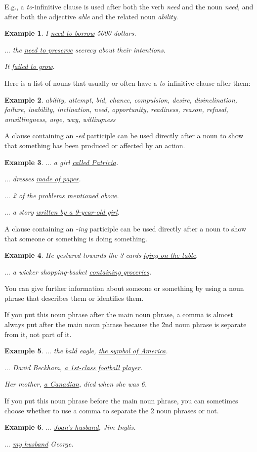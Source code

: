 \documentclass[oneside]{book}
\numberwithin{equation}{section}
\newtheorem{example}{Example}[section]
\begin{document}
E.g., a \textit{to}-infinitive clause is used after both the verb \textit{need} and the noun \textit{need}, and after both the adjective \textit{able} and the related noun \textit{ability}.
\begin{example}
    I \underline{need to borrow} 5000 dollars.
    
    $\ldots$ the \underline{need to preserve} secrecy about their intentions.
    
    It \underline{failed to grow}.
\end{example}
%
\noindent{} Here is a list of nouns that usually or often have a \textit{to}-infinitive clause after them:
\begin{example}
    ability, attempt, bid, chance, compulsion, desire, disinclination, failure, inability, inclination, need, opportunity, readiness, reason, refusal, unwillingness, urge, way, willingness
\end{example}
%
\noindent{} A clause containing an \textit{-ed} participle can be used directly after a noun to show that something has been produced or affected by an action.
\begin{example}
    $\ldots$ a girl \underline{called Patricia}.
    
    $\ldots$ dresses \underline{made of paper}.
    
    $\ldots$ 2 of the problems \underline{mentioned above}.
    
    $\ldots$ a story \underline{written by a 9-year-old girl}.
\end{example}
%
\noindent{} A clause containing an \textit{-ing} participle can be used directly after a noun to show that someone or something is doing something.
\begin{example}
    He gestured towards the 3 cards \underline{lying on the table}.
    
    $\ldots$ a wicker shopping-basket \underline{containing groceries}.
\end{example}
%
\noindent{} You can give further information about someone or something by using a noun phrase that describes them or identifies them.

%
If you put this noun phrase after the main noun phrase, a comma is almost always put after the main noun phrase because the 2nd noun phrase is separate from it, not part of it.
\begin{example}
    $\ldots$ the bald eagle, \underline{the symbol of America}.
    
    $\ldots$ David Beckham, \underline{a 1st-class football player}.
    
    Her mother, \underline{a Canadian}, died when she was 6.
\end{example}
If you put this noun phrase before the main noun phrase, you can sometimes choose whether to use a comma to separate the 2 noun phrases or not.
\begin{example}
    $\ldots$ \underline{Joan's husband}, Jim Inglis.
    
    $\ldots$ \underline{my husband} George.
\end{example}
\end{document}
